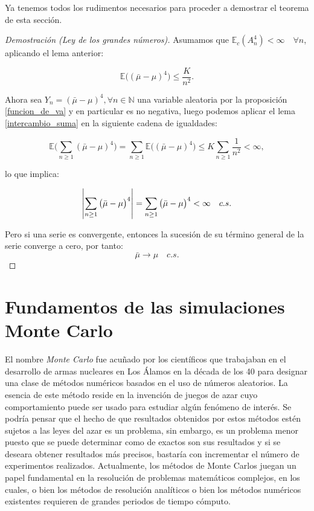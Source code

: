 \documentclass[../proyecto.tex]{memoir}
\begin{document}
Ya tenemos todos los rudimentos necesarios para proceder a demostrar el teorema de esta sección.

\begin{proof}[Demostración (Ley de los grandes números)]

Asumamos que $\mathds{E}_c( A_n^4) < \infty \quad \forall n$, aplicando el lema anterior:

$$
	\mathds{E} \big( ( \bar{ \mu } - \mu ) ^ 4 \big) \leq \frac{K}{n^{2}}.
$$

Ahora sea $Y_n = ( \bar{ \mu } - \mu ) ^ 4, \forall n \in \mathds{N}$ una variable aleatoria por la proposición \ref{funcion_de_va} y en particular es no negativa, luego podemos aplicar el lema \ref{intercambio_suma} en la siguiente cadena de igualdades:

$$
	\mathds{E} \big( \sum_{n \geq 1}( \bar{ \mu } - \mu ) ^ 4 \big) = \sum_{n \geq 1} \mathds{E} \big( ( \bar{ \mu } - \mu ) ^ 4 \big)  \leq K\sum_{n \geq 1}\frac{1}{n^{2}} < \infty,
$$

lo que implica:

$$
\abs{ \sum_{n \geq 1} \big( \bar{ \mu } - \mu \big)^ 4 } = \sum_{n \geq 1} \big( \bar{ \mu } - \mu \big)^ 4 < \infty \quad c.s. 
$$

Pero si una serie es convergente, entonces la sucesión de su término general de la serie converge a cero, por tanto:
$$
 \bar{ \mu } \to \mu \quad c.s.
$$
\end{proof}


\section{Fundamentos de las simulaciones Monte Carlo} \label{MonteCarlo}

El nombre \textit{Monte Carlo} fue acuñado por los científicos que trabajaban en el desarrollo de armas nucleares en Los Álamos en la década de los 40 para designar una clase de métodos numéricos basados en el uso de números aleatorios. La esencia de este método reside en la invención de juegos de azar cuyo comportamiento puede ser usado para estudiar algún fenómeno de interés. Se podría pensar que el hecho de que resultados obtenidos por estos métodos estén sujetos a las leyes del azar es un problema, sin embargo, es un problema menor puesto que se puede determinar como de exactos son sus resultados y si se deseara obtener resultados más precisos, bastaría con incrementar el número de experimentos realizados. Actualmente, los métodos de Monte Carlos juegan un papel fundamental en la resolución de problemas matemáticos complejos, en los cuales, o bien los métodos de resolución analíticos o bien los métodos numéricos existentes requieren de grandes periodos de tiempo cómputo.
\end{document}
